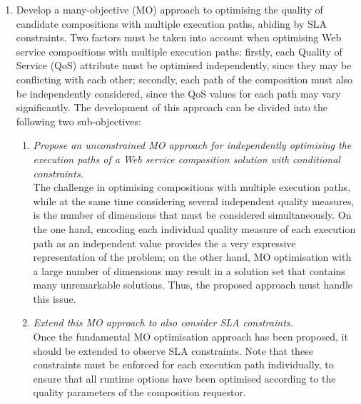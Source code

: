 \begin{enumerate}
 \item \label{obj:mo} Develop a many-objective (MO) approach to optimising the quality of candidate compositions with multiple execution paths, abiding by SLA constraints. Two factors must be taken into account when optimising Web service compositions with multiple execution paths: firstly, each Quality of Service (QoS) attribute must be optimised independently, since they may be conflicting with each other; secondly, each path of the composition must also be independently considered, since the QoS values for each path may vary significantly. The development of this approach can be divided into the following two sub-objectives:
 
   \begin{enumerate}
    \item \label{obj:simple-mo} \emph{Propose an unconstrained MO approach for independently optimising the execution paths of a Web service composition solution with conditional constraints.}\\
    The challenge in optimising compositions with multiple execution paths, while at the same time considering several independent quality measures, is the number of dimensions that must be considered simultaneously. On the one hand, encoding each individual quality measure of each execution path as an independent value provides the a very expressive representation of the problem; on the other hand, MO optimisation with a large number of dimensions may result in a solution set that contains many unremarkable solutions. Thus, the proposed approach must handle this issue.
    \item \label{obj:sla-mo} \emph{Extend this MO approach to also consider SLA constraints.}\\
    Once the fundamental MO optimisation approach has been proposed, it should be extended to observe SLA constraints. Note that these constraints must be enforced for each execution path individually, to ensure that all runtime options have been optimised according to the quality parameters of the composition requestor.
   \end{enumerate}
 

\end{enumerate}
